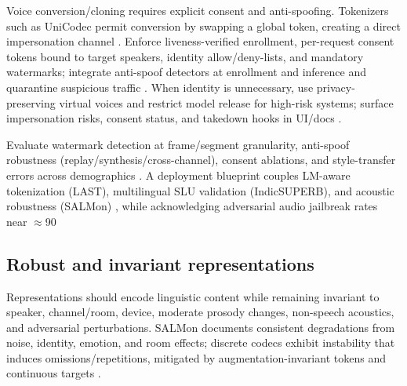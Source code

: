\documentclass{article}
\begin{document}
Voice conversion/cloning requires explicit consent and anti-spoofing. Tokenizers such as UniCodec permit conversion by swapping a global token, creating a direct impersonation channel \cite{jiang2025universalspeechtokenlearninglowbitratene}. Enforce liveness-verified enrollment, per-request consent tokens bound to target speakers, identity allow/deny-lists, and mandatory watermarks; integrate anti-spoof detectors at enrollment and inference and quarantine suspicious traffic \cite{bai2025dmelspeechtokenizationmadesimple}. When identity is unnecessary, use privacy-preserving virtual voices and restrict model release for high-risk systems; surface impersonation risks, consent status, and takedown hooks in UI/docs \cite{zhao2024advancingspeechlanguagemodelsscalingsupe,park2025longformspeechgenerationspokenlanguagemo,gong2024seamlessexpressivelmspeechlanguagemodele}.

Evaluate watermark detection at frame/segment granularity, anti-spoof robustness (replay/synthesis/cross-channel), consent ablations, and style-transfer errors across demographics \cite{wang2025ssrspeechtowardsstablesaferobustzeroshot,bai2025dmelspeechtokenizationmadesimple,gong2024seamlessexpressivelmspeechlanguagemodele}. A deployment blueprint couples LM-aware tokenization (LAST), multilingual SLU validation (IndicSUPERB), and acoustic robustness (SALMon) \cite{turetzky2024lastlanguagemodelawarespeechtokenization,entry2025indicsuperbspeechprocessinguniversalperf,maimon2025salmonsuiteacousticlanguagemodelevaluati}, while acknowledging adversarial audio jailbreak rates near $\approx$90%

\subsection{Robust and invariant representations} \label{subsec:robustandinvariantrepresentations}
Representations should encode linguistic content while remaining invariant to speaker, channel/room, device, moderate prosody changes, non-speech acoustics, and adversarial perturbations. SALMon documents consistent degradations from noise, identity, emotion, and room effects; discrete codecs exhibit instability that induces omissions/repetitions, mitigated by augmentation-invariant tokens and continuous targets \cite{maimon2025salmonsuiteacousticlanguagemodelevaluati,liu2024analyzingmitigatinginconsistencydiscrete,yuan2024continuousspeechtokensmakesllmsrobustmul,fily2024establishingdegreesclosenessbetweenaudio}.
\end{document}
